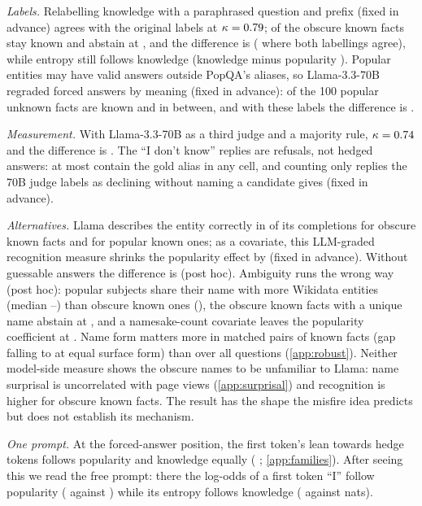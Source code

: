 \documentclass{article}
\newcommand{\idk}{``I don't know''}
\begin{document}
\emph{Labels.} Relabelling knowledge with a paraphrased question and prefix (fixed in advance) agrees with the original labels at $\kappa=0.79$; \eoObsKnownN{} of the \gsObsKnownTotal{} obscure known facts stay known and abstain at \eoObsKnown, and the difference is \eoDiff{} \eoDiffCI{} (\lcCons{} \lcConsCI{} where both labellings agree), while entropy still follows knowledge (knowledge minus popularity \eoEntKmP{} \eoEntKmPCI). Popular entities may have valid answers outside PopQA's aliases, so Llama-3.3-70B regraded forced answers by meaning (fixed in advance): \sePUKnown{} of the 100 popular unknown facts are known and \sePUInter{} in between, and with these labels the difference is \seDiff{} \seDiffCI.

\emph{Measurement.} With Llama-3.3-70B as a third judge and a majority rule, $\kappa=0.74$ and the difference is \tjLlamaDiff{} \tjLlamaDiffCI. The \idk{} replies are refusals, not hedged answers: at most \lcDKAliasMax{} contain the gold alias in any cell, and counting only replies the 70B judge labels as declining without naming a candidate gives \sdDiff{} \sdDiffCI{} (fixed in advance).

\emph{Alternatives.} Llama describes the entity correctly in \ekObsKnown{} of its completions for obscure known facts and \ekPopKnown{} for popular known ones; as a covariate, this LLM-graded recognition measure shrinks the popularity effect by \ekShrink{} (fixed in advance). Without guessable answers the difference is \gsDiff{} \gsDiffCI{} (post hoc). Ambiguity runs the wrong way (post hoc): popular subjects share their name with more Wikidata entities (median \amPopKnownHom--\amPopUnkHom) than obscure known ones (\amObsKnownHom), the \amSingleN{} obscure known facts with a unique name abstain at \amSingle, and a namesake-count covariate leaves the popularity coefficient at \amObs{} \amObsCI. Name form matters more in matched pairs of known facts (gap \scPopKnownGap{} falling to \scPopKnownGapSurface{} \scPopKnownGapSurfaceCI{} at equal surface form) than over all questions (\cref{app:robust}). Neither model-side measure shows the obscure names to be unfamiliar to Llama: name surprisal is uncorrelated with page views (\cref{app:surprisal}) and recognition is higher for obscure known facts. The result has the shape the misfire idea predicts but does not establish its mechanism.

\emph{One prompt.} At the forced-answer position, the first token's lean towards hedge tokens follows popularity and knowledge equally (\loLlamaDiff{} \loLlamaDiffCI; \cref{app:families}). After seeing this we read the free prompt: there the log-odds of a first token ``I'' follow popularity (\eoFreeIPop{} against \eoFreeIKnow) while its entropy follows knowledge (\eoFreeEntKnow{} against \eoFreeEntPop{} nats).
\end{document}
